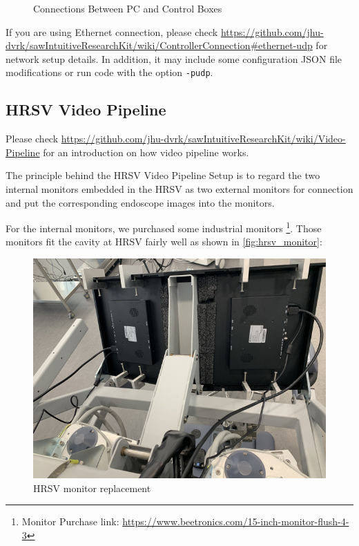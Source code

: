 \begin{figure}[H]
\centering
{}
\hfil
{}
\caption{Connections Between PC and Control Boxes}
\label{fig:PC_connect}
\end{figure}

If you are using Ethernet connection, please check \url{https://github.com/jhu-dvrk/sawIntuitiveResearchKit/wiki/ControllerConnection#ethernet-udp} for network setup details. In addition, it may include some configuration JSON file modifications or run code with the option \texttt{-pudp}.

\subsection{HRSV Video Pipeline}

Please check \url{https://github.com/jhu-dvrk/sawIntuitiveResearchKit/wiki/Video-Pipeline} for an introduction on how video pipeline works.

The principle behind the HRSV Video Pipeline Setup is to regard the two internal monitors embedded in the HRSV as two external monitors for connection and put the corresponding endoscope images into the monitors. 

For the internal monitors, we purchased some industrial monitors \footnote[2]{Monitor Purchase link: \url{https://www.beetronics.com/15-inch-monitor-flush-4-3}}. Those monitors fit the cavity at HRSV fairly well as shown in \autoref{fig:hrsv_monitor}:

\begin{figure}[H]
    \centering 
    \includegraphics[width=0.55\linewidth]{figures/HRSV_sol.png}
    \caption{HRSV monitor replacement}
    \label{fig:hrsv_monitor}
\end{figure}

